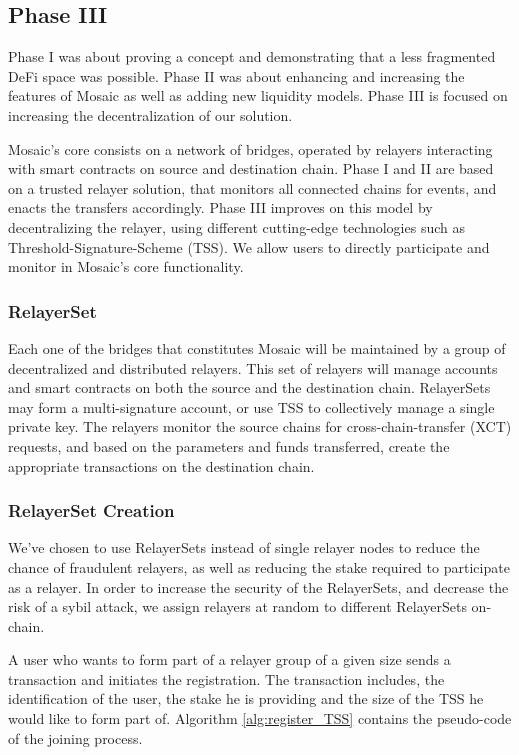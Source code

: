 \subsection{Phase III}

Phase I was about proving a concept and demonstrating that a less fragmented DeFi space was possible. Phase II was about enhancing and increasing the features of Mosaic as well as adding new liquidity models. Phase III is focused on increasing the decentralization of our solution. 

Mosaic’s core consists on a network of bridges, operated by relayers interacting with smart contracts on source and destination chain. Phase I and II are based on a trusted relayer solution, that monitors all connected chains for events, and enacts the transfers accordingly. Phase III improves on this model by decentralizing the relayer, using different cutting-edge technologies such as Threshold-Signature-Scheme (TSS). We allow users to directly participate and monitor in Mosaic's core functionality.

\subsubsection*{RelayerSet}
Each one of the bridges that constitutes Mosaic will be maintained by a group of decentralized and distributed relayers. This set of relayers will manage accounts and smart contracts on both the source and the destination chain. RelayerSets may form a multi-signature account, or use TSS to collectively manage a single private key. The relayers monitor the source chains for cross-chain-transfer (XCT) requests, and based on the parameters and funds transferred, create the appropriate transactions on the destination chain.

\subsubsection*{RelayerSet Creation}
We’ve chosen to use RelayerSets instead of single relayer nodes to reduce the chance of fraudulent relayers, as well as reducing the stake required to participate as a relayer. In order to increase the security of the RelayerSets, and decrease the risk of a sybil attack, we assign relayers at random to different RelayerSets on-chain.

A user who wants to form part of a relayer group of a given size sends a transaction and initiates the registration. The transaction includes, the identification of the user, the stake he is providing and the size of the TSS he would like to form part of. Algorithm \ref{alg:register_TSS} contains the pseudo-code of the joining process.

